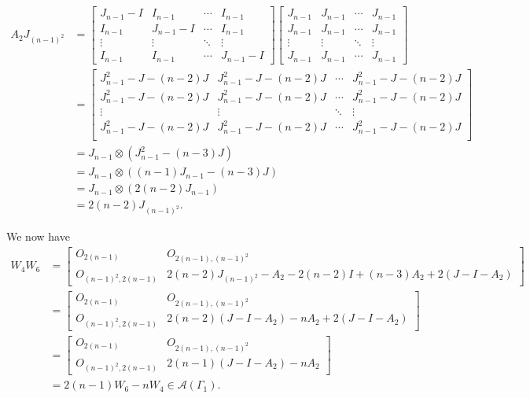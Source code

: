 \begin{itemize}
    \begin{align*}
        A_2J_{(n-1)^2}
        &= \begin{bmatrix}
            J_{n-1} - I & I_{n-1} & \cdots & I_{n-1} \\
            I_{n-1} & J_{n-1} - I & \cdots & I_{n-1} \\
            \vdots & \vdots & \ddots & \vdots \\
            I_{n-1} & I_{n-1} & \cdots & J_{n-1} - I
        \end{bmatrix}\begin{bmatrix}
            J_{n-1} & J_{n-1} & \cdots & J_{n-1} \\
            J_{n-1} & J_{n-1} & \cdots & J_{n-1} \\
            \vdots & \vdots & \ddots & \vdots \\
            J_{n-1} & J_{n-1} & \cdots & J_{n-1}
        \end{bmatrix} \\
        &= \begin{bmatrix}
            J_{n-1}^2 -J - (n-2)J & J_{n-1}^2 -J - (n-2)J & \cdots & J_{n-1}^2 -J - (n-2)J \\
            J_{n-1}^2 -J - (n-2)J & J_{n-1}^2 -J - (n-2)J & \cdots & J_{n-1}^2 -J - (n-2)J \\
            \vdots & \vdots & \ddots & \vdots\\
            J_{n-1}^2 -J - (n-2)J & J_{n-1}^2 -J - (n-2)J & \cdots & J_{n-1}^2 -J - (n-2)J \\
        \end{bmatrix} \\
        &= J_{n-1} \otimes (J_{n-1}^2 - (n-3)J) \\
        &= J_{n-1} \otimes ((n-1)J_{n-1} - (n-3)J) \\
        &= J_{n-1} \otimes (2(n-2)J_{n-1}) \\
        &= 2(n-2)J_{(n-1)^2}.
    \end{align*}

    We now have
    \begin{align*}
        W_4W_6
        &= \begin{bmatrix}
            O_{2(n-1)} & O_{2(n-1), (n-1)^2} \\
            O_{(n-1)^2, 2(n-1)} & 2(n-2)J_{(n-1)^2} - A_2 - 2(n-2)I + (n-3)A_2 + 2(J-I-A_2)
        \end{bmatrix} \\
        &= \begin{bmatrix}
            O_{2(n-1)} & O_{2(n-1), (n-1)^2} \\
            O_{(n-1)^2, 2(n-1)} & 2(n-2)(J - I- A_2) -nA_2 + 2(J-I-A_2)
        \end{bmatrix}\\
        &= \begin{bmatrix}
            O_{2(n-1)} & O_{2(n-1), (n-1)^2} \\
            O_{(n-1)^2, 2(n-1)} & 2(n-1)(J - I- A_2) -nA_2
        \end{bmatrix}\\
        &= 2(n-1)W_6 - nW_4\in \mathcal{A}(\Gamma_1).
    \end{align*}
    

\end{itemize}

